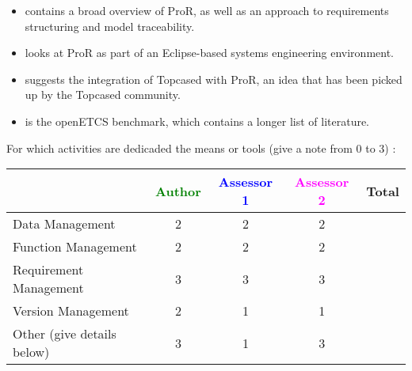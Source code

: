 \begin{itemize}

\item \cite{RMF_Mark_Book_Jastram_2013} contains a broad overview of ProR, as well as an approach to requirements structuring and model traceability.

\item \cite{jastram_forms_2012} looks at ProR as part of an Eclipse-based systems engineering environment.

\item \cite{topcase-JaGr2011} suggests the integration of Topcased with ProR, an idea that has been picked up by the Topcased community.

\item \cite{pror-benchmark} is the openETCS benchmark, which contains a longer list of literature.

\end{itemize}

For which activities are dedicaded the means or tools (give a note from 0 to  3) :

\begin{tabular}{|l | c | c | c | c|}
\hline
& \textcolor{green}{Author} & \textcolor{blue}{Assessor 1} & \textcolor{magenta}{Assessor 2} & Total \\
\hline
Data Management & 2 & 2 & 2 &  \\
\hline
Function Management & 2 & 2 & 2 & \\
\hline
Requirement Management & 3 & 3 & 3 & \\
\hline
Version Management & 2 & 1 & 1 & \\
\hline
Other (give details below) & 3 & 1 & 3 & \\
\hline
\end{tabular}

